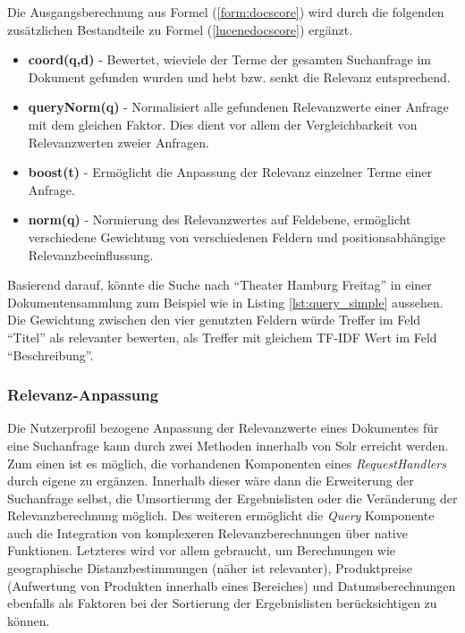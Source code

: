 Die Ausgangsberechnung aus Formel (\ref{form:docscore}) wird durch die folgenden zusätzlichen Bestandteile zu Formel (\ref{lucenedocscore}) ergänzt.

\begin{itemize}
\item \textbf{coord(q,d)} - Bewertet, wieviele der Terme der gesamten Suchanfrage im Dokument gefunden wurden und hebt bzw. senkt die Relevanz entsprechend.
\item \textbf{queryNorm(q)} - Normalisiert alle gefundenen Relevanzwerte einer Anfrage mit dem gleichen Faktor. Dies dient vor allem der Vergleichbarkeit von Relevanzwerten zweier Anfragen.
\item \textbf{boost(t)} - Ermöglicht die Anpassung der Relevanz einzelner Terme einer Anfrage.
\item \textbf{norm(q)} - Normierung des Relevanzwertes auf Feldebene, ermöglicht verschiedene Gewichtung von verschiedenen Feldern und positionsabhängige Relevanzbeeinflussung.
\end{itemize}

Basierend darauf, könnte die Suche nach ``Theater Hamburg Freitag'' in einer Dokumentensammlung zum Beispiel wie in Listing \ref{lst:query_simple} aussehen. Die Gewichtung zwischen den vier genutzten Feldern würde Treffer im Feld ``Titel'' als relevanter bewerten, als Treffer mit gleichem \acs{TF-IDF} Wert im Feld ``Beschreibung''. \citep{TFIDFSimilarity}



\subsubsection{Relevanz-Anpassung} \label{sec:searchrelevance}

Die Nutzerprofil bezogene Anpassung der Relevanzwerte eines Dokumentes für eine Suchanfrage kann durch zwei Methoden innerhalb von Solr erreicht werden. Zum einen ist es möglich, die vorhandenen Komponenten eines \textit{RequestHandlers} durch eigene zu ergänzen. Innerhalb dieser wäre dann die Erweiterung der Suchanfrage selbst, die Umsortierung der Ergebnislisten oder die Veränderung der Relevanzberechnung möglich. Des weiteren ermöglicht die \textit{Query} Komponente auch die Integration von komplexeren Relevanzberechnungen über native Funktionen. Letzteres wird vor allem gebraucht, um Berechnungen wie geographische Distanzbestimmungen (näher ist relevanter), Produktpreise (Aufwertung von Produkten innerhalb eines Bereiches) und Datumsberechnungen ebenfalls als Faktoren bei der Sortierung der Ergebnislisten berücksichtigen zu können.

